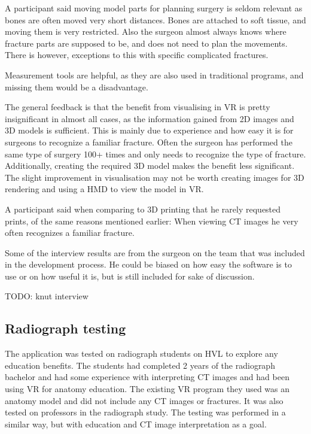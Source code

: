 \documentclass[a4paper]{report}
\begin{document}
A participant said moving model parts for planning surgery is seldom relevant as bones are often moved very short distances. Bones are attached to soft tissue, and moving them is very restricted.
Also the surgeon almost always knows where fracture parts are supposed to be, and does not need to plan the movements. There is however, exceptions to this with specific complicated fractures.

Measurement tools are helpful, as they are also used in traditional programs, and missing them would be a disadvantage.

The general feedback is that the benefit from visualising in VR is pretty insignificant in almost all cases, as the information gained from 2D images and 3D models is sufficient.
This is mainly due to experience and how easy it is for surgeons to recognize a familiar fracture. Often the surgeon has performed the same type of surgery 100+ times and only needs to recognize the type of fracture. Additionally, creating the required 3D model makes the benefit less significant.
The slight improvement in visualisation may not be worth creating images for 3D rendering and using a HMD to view the model in VR.

A participant said when comparing to 3D printing that he rarely requested prints, of the same reasons mentioned earlier: When viewing CT images he very often recognizes a familiar fracture. 

Some of the interview results are from the surgeon on the team that was included in the development process. He could be biased on how easy the software is to use or on how useful it is, but is still included for sake of discussion.

TODO: knut interview

\subsection{Radiograph testing}

The application was tested on radiograph students on HVL to explore any education benefits. The students had completed 2 years of the radiograph bachelor and had some experience with interpreting CT images and had been using VR for anatomy education.
The existing VR program they used was an anatomy model and did not include any CT images or fractures.
It was also tested on professors in the radiograph study.
The testing was performed in a similar way, but with education and CT image interpretation as a goal.
\end{document}
